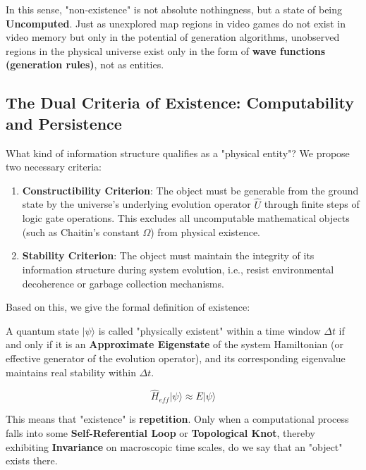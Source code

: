 In this sense, "non-existence" is not absolute nothingness, but a state of being \textbf{Uncomputed}. Just as unexplored map regions in video games do not exist in video memory but only in the potential of generation algorithms, unobserved regions in the physical universe exist only in the form of \textbf{wave functions (generation rules)}, not as entities.

\subsection{The Dual Criteria of Existence: Computability and Persistence}

What kind of information structure qualifies as a "physical entity"? We propose two necessary criteria:

\begin{enumerate}
\item \textbf{Constructibility Criterion}: The object must be generable from the ground state by the universe's underlying evolution operator $\hat{U}$ through finite steps of logic gate operations. This excludes all uncomputable mathematical objects (such as Chaitin's constant $\Omega$) from physical existence.

\item \textbf{Stability Criterion}: The object must maintain the integrity of its information structure during system evolution, i.e., resist environmental decoherence or garbage collection mechanisms.
\end{enumerate}

Based on this, we give the formal definition of existence:

\begin{definition}
A quantum state $|\psi\rangle$ is called "physically existent" within a time window $\Delta t$ if and only if it is an \textbf{Approximate Eigenstate} of the system Hamiltonian (or effective generator of the evolution operator), and its corresponding eigenvalue maintains real stability within $\Delta t$.

\begin{equation}
\hat{H}_{eff} |\psi\rangle \approx E |\psi\rangle
\end{equation}
\end{definition}

This means that "existence" is \textbf{repetition}. Only when a computational process falls into some \textbf{Self-Referential Loop} or \textbf{Topological Knot}, thereby exhibiting \textbf{Invariance} on macroscopic time scales, do we say that an "object" exists there.

